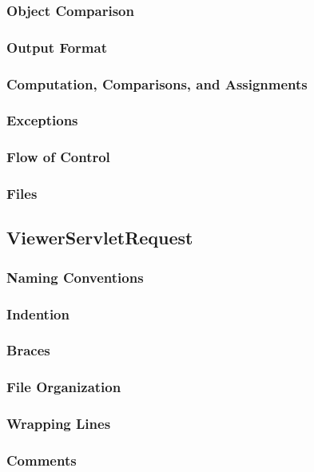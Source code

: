 \documentclass{article}
\begin{document}
  \subsubsection{Object Comparison}
  \subsubsection{Output Format}
  \subsubsection{Computation, Comparisons, and Assignments}
  \subsubsection{Exceptions}
  \subsubsection{Flow of Control}
  \subsubsection{Files}

\newpage
  
 \subsection{ViewerServletRequest}
 \subsubsection{Naming Conventions}
 \subsubsection{Indention}
 \subsubsection{Braces}
 \subsubsection{File Organization}
 \subsubsection{Wrapping Lines}
 \subsubsection{Comments}
\end{document}
